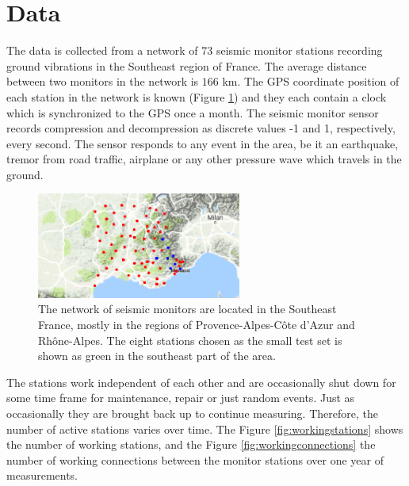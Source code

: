 \documentclass[12pt, sumlimits, intlimits]{article}
\begin{document}
\section{Data}

The data is collected from a network of 73 seismic monitor stations recording ground vibrations in the Southeast region of France. The average distance between two monitors in the network is $166$ km. The GPS coordinate position of each station in the network is known (Figure \ref{fig:monitornetwork}) and they each contain a clock which is synchronized to the GPS once a month. The seismic monitor sensor records compression and decompression as discrete values -1 and 1, respectively, every second. The sensor responds to any event in the area, be it an earthquake, tremor from road traffic, airplane or any other pressure wave which travels in the ground.

\begin{figure}[ht]
	\begin{center}   
		\includegraphics[width=0.6\textwidth]{../figures/TestStations_zoom.png}
	\end{center}
	\caption{The network of seismic monitors are located in the Southeast France, mostly in the regions of Provence-Alpes-C\^{o}te d'Azur and Rh\^{o}ne-Alpes. The eight stations chosen as the small test set is shown as green in the southeast part of the area.}\label{fig:monitornetwork}
\end{figure}

The stations work independent of each other and are occasionally shut down for some time frame for maintenance, repair or just random events. Just as occasionally they are brought back up to continue measuring.  Therefore, the number of active stations varies over time. The Figure \ref{fig:workingstations} shows the number of working stations, and the Figure \ref{fig:workingconnections} the number of working connections between the monitor stations over one year of measurements. 
\end{document}
